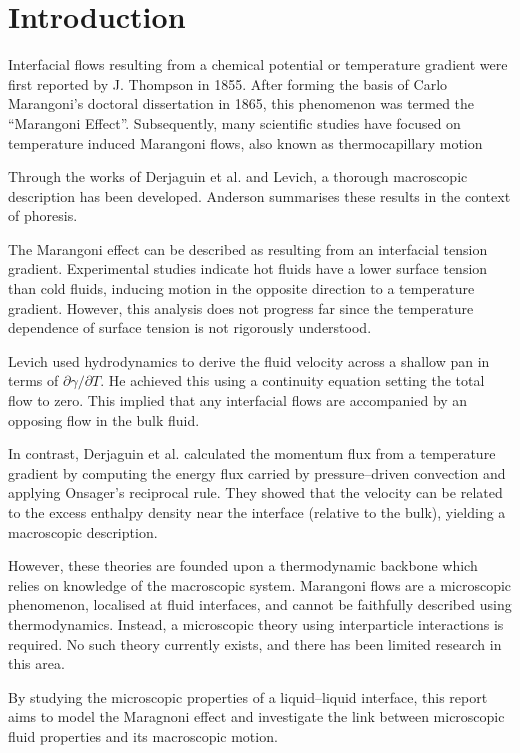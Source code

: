 \section{Introduction}
Interfacial flows resulting from a chemical potential or temperature gradient were first reported by J. Thompson in 1855.\cite{JThompson}
After forming the basis of Carlo Marangoni's doctoral dissertation in 1865, this phenomenon was termed the ``Marangoni Effect''.\cite{Marangoni}
Subsequently, many scientific studies have focused on temperature induced Marangoni flows, also known as thermocapillary motion

Through the works of Derjaguin et al.\cite{SurfaceForces} and Levich\cite{Levich}, a thorough macroscopic description has been developed.
Anderson summarises these results in the context of phoresis.\cite{Anderson}

The Marangoni effect can be described as resulting from an interfacial tension gradient.
Experimental studies indicate hot fluids have a lower surface tension than cold fluids,\cite{Ficalbi1972,Kayser1975} inducing motion in the opposite direction to a temperature gradient.
However, this analysis does not progress far since the temperature dependence of surface tension is not rigorously understood.

Levich used hydrodynamics to derive the fluid velocity across a shallow pan in terms of $\partial \gamma / \partial T$.\cite{Levich}
He achieved this using a continuity equation setting the total flow to zero.
This implied that any interfacial flows are accompanied by an opposing flow in the bulk fluid.

In contrast, Derjaguin et al. calculated the momentum flux from a temperature gradient by computing the energy flux carried by pressure--driven convection and applying Onsager's reciprocal rule.\cite{SurfaceForces}
They showed that the velocity can be related to the excess enthalpy density near the interface (relative to the bulk), yielding a macroscopic description.

However, these theories are founded upon a thermodynamic backbone which relies on knowledge of the macroscopic system.
Marangoni flows are a microscopic phenomenon, localised at fluid interfaces, and cannot be faithfully described using thermodynamics.
Instead, a microscopic theory using interparticle interactions is required.
No such theory currently exists, and there has been limited research in this area.\cite{HolgerBoppHampe}

By studying the microscopic properties of a liquid--liquid interface, this report aims to model the Maragnoni effect and investigate the link between microscopic fluid properties and its macroscopic motion.


